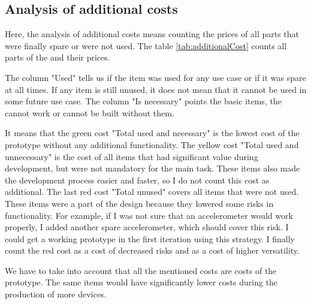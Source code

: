 \subsection{Analysis of additional costs}
\label{HWadditionalCosts}
Here, the analysis of additional costs means counting the prices of all parts that were finally spare or were not used. The table \ref{tab:additionalCost} counts all parts of the  and their prices.

The column "Used" tells us if the item was used for any use case or if it was spare at all times. If any item is still unused, it does not mean that it cannot be used in some future use case. The column "Is necessary" points the basic items, the  cannot work or cannot be built without them.

It means that the green cost "Total used and necessary" is the lowest cost of the prototype without any additional functionality. The yellow cost "Total used and unnecessary" is the cost of all items that had significant value during development, but were not mandatory for the main task. These items also made the development process easier and faster, so I do not count this cost as additional. The last red cost "Total unused" covers all items that were not used. These items were a part of the design because they lowered some risks in functionality. For example, if I was not sure that an accelerometer would work properly, I added another spare accelerometer, which should cover this risk. I could get a working prototype in the first iteration using this strategy. I finally count the red cost as a cost of decreased risks and as a cost of higher versatility.

We have to take into account that all the mentioned costs are costs of the prototype. The same items would have significantly lower costs during the production of more devices.

